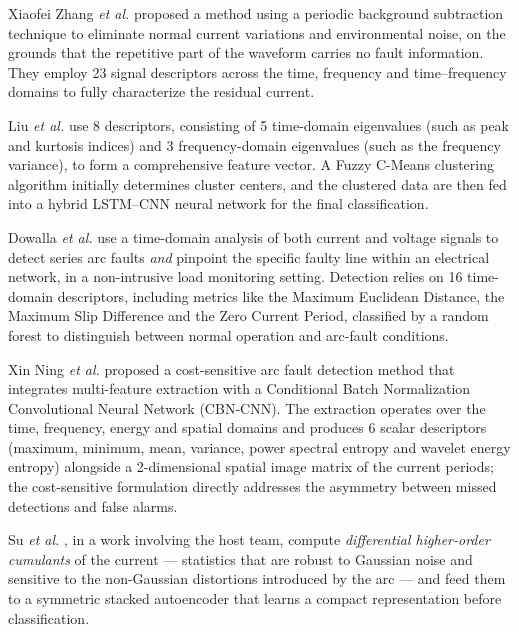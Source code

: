 \medskip

Xiaofei Zhang \emph{et al.} \cite{zhang2025background} proposed a method using a periodic background subtraction technique to eliminate normal current variations and environmental noise, on the grounds that the repetitive part of the waveform carries no fault information. They employ 23 signal descriptors across the time, frequency and time--frequency domains to fully characterize the residual current.

\medskip

Liu \emph{et al.} \cite{liu2023fcm} use 8 descriptors, consisting of 5 time-domain eigenvalues (such as peak and kurtosis indices) and 3 frequency-domain eigenvalues (such as the frequency variance), to form a comprehensive feature vector. A Fuzzy C-Means clustering algorithm initially determines cluster centers, and the clustered data are then fed into a hybrid LSTM--CNN neural network for the final classification.

\medskip

Dowalla \emph{et al.} \cite{dowalla2023} use a time-domain analysis of both current and voltage signals to detect series arc faults \emph{and} pinpoint the specific faulty line within an electrical network, in a non-intrusive load monitoring setting. Detection relies on 16 time-domain descriptors, including metrics like the Maximum Euclidean Distance, the Maximum Slip Difference and the Zero Current Period, classified by a random forest to distinguish between normal operation and arc-fault conditions.

\medskip

Xin Ning \emph{et al.} \cite{ning2024cbn} proposed a cost-sensitive arc fault detection method that integrates multi-feature extraction with a Conditional Batch Normalization Convolutional Neural Network (CBN-CNN). The extraction operates over the time, frequency, energy and spatial domains and produces 6 scalar descriptors (maximum, minimum, mean, variance, power spectral entropy and wavelet energy entropy) alongside a 2-dimensional spatial image matrix of the current periods; the cost-sensitive formulation directly addresses the asymmetry between missed detections and false alarms.

\medskip

Su \emph{et al.} \cite{su2026cumulants}, in a work involving the host team, compute \emph{differential higher-order cumulants} of the current --- statistics that are robust to Gaussian noise and sensitive to the non-Gaussian distortions introduced by the arc --- and feed them to a symmetric stacked autoencoder that learns a compact representation before classification.

